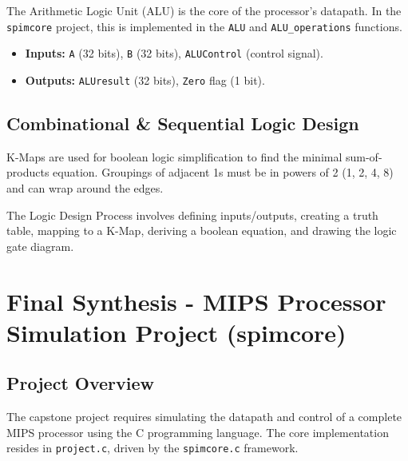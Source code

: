 \begin{vocabulary}
The Arithmetic Logic Unit (ALU) is the core of the processor's datapath. In the \texttt{spimcore} project, this is implemented in the \texttt{ALU} and \texttt{ALU\_operations} functions.
\begin{itemize}
    \item \textbf{Inputs:} \texttt{A} (32 bits), \texttt{B} (32 bits), \texttt{ALUControl} (control signal).
    \item \textbf{Outputs:} \texttt{ALUresult} (32 bits), \texttt{Zero} flag (1 bit).
\end{itemize}
\end{vocabulary}

\subsection{Combinational \& Sequential Logic Design}

\begin{remark}
K-Maps are used for boolean logic simplification to find the minimal sum-of-products equation. Groupings of adjacent 1s must be in powers of 2 (1, 2, 4, 8) and can wrap around the edges.
\end{remark}

\begin{remark}
The Logic Design Process involves defining inputs/outputs, creating a truth table, mapping to a K-Map, deriving a boolean equation, and drawing the logic gate diagram.
\end{remark}

\section{Final Synthesis - MIPS Processor Simulation Project (spimcore)}

\subsection{Project Overview}

\begin{remark}
The capstone project requires simulating the datapath and control of a complete MIPS processor using the C programming language. The core implementation resides in \texttt{project.c}, driven by the \texttt{spimcore.c} framework.
\end{remark}


